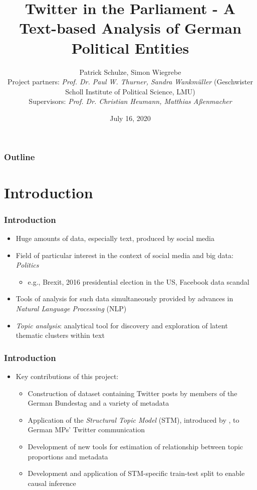 \documentclass[xcolor=dvipsnames]{beamer}
\title{Twitter in the Parliament - A Text-based Analysis of German Political Entities}
\date{July 16, 2020}
\author[author1]{Patrick Schulze, Simon Wiegrebe\\[5mm]{\tiny
Project partners: \textit{Prof. Dr. Paul W. Thurner, Sandra Wankmüller} (Geschwister Scholl Institute of Political Science, LMU) \\[2mm]
Supervisors: \textit{Prof. Dr. Christian Heumann, Matthias Aßenmacher}
}}
\begin{document}
\begin{frame}
\titlepage
\end{frame}

\begin{frame}
\frametitle{Outline}
\tableofcontents[]
\end{frame}

\section{Introduction}
\begin{frame}
\frametitle{Introduction}
\begin{itemize}
\item Huge amounts of data, especially text, produced by social media
\item Field of particular interest in the context of social media and big data: \textit{Politics}
	\begin{itemize}
	\item e.g., Brexit, 2016 presidential election in the US, Facebook data scandal
	\end{itemize}		
\item Tools of analysis for such data simultaneously provided by advances in \textit{Natural Language Processing} (NLP)
\item \textit{Topic analysis}: analytical tool for discovery and exploration of latent thematic clusters within text 
\end{itemize}
\end{frame}

\begin{frame}
\frametitle{Introduction}
\begin{itemize}
\item Key contributions of this project:
	\begin{itemize}
	\item Construction of dataset containing Twitter posts by members of the German Bundestag and a variety of metadata
	\item Application of the \textit{Structural Topic Model} (STM), introduced by \cite{roberts2016model}, to German MPs' Twitter communication
	\item Development of new tools for estimation of relationship between topic proportions and metadata
	\item Development and application of STM-specific train-test split to enable causal inference
	\end{itemize}
\end{itemize}
\end{frame}
\end{document}

